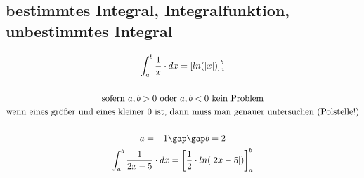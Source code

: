 \subsection{bestimmtes Integral, Integralfunktion, unbestimmtes Integral}
\begin{gather*}
  \int_a^b \frac{1}{x} \cdot dx = \left[ln(|x|)\right]_a^b \\\\
  \text{sofern } a, b > 0 \text{ oder } a, b < 0 \text{ kein Problem} \\
  \text{wenn eines größer und eines kleiner $0$ ist, dann muss man genauer untersuchen (Polstelle!)} \\\\
  a = -1 \gap\gap b = 2 \\
  \int_a^b \frac{1}{2x - 5} \cdot dx = \left[\frac{1}{2} \cdot ln(|2x - 5|)\right]_a^b
\end{gather*}
